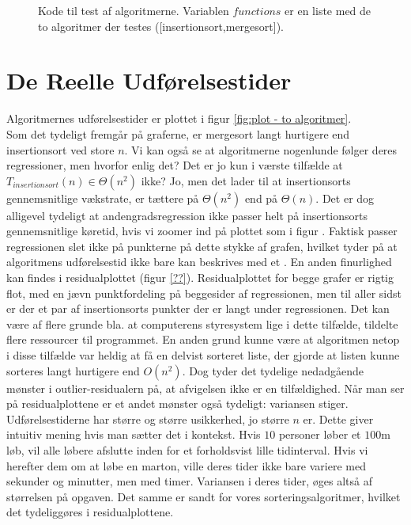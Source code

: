 \begin{figure}
	\begin{center}
		
	\end{center}
	\caption{Kode til test af algoritmerne. Variablen $functions$ er en liste med de to algoritmer der testes ([insertionsort,mergesort]).}
	\label{fig:Kode til test af algoritmerne}
\end{figure}



\section{De Reelle Udførelsestider}
\label{sec:De Reelle Køretider}

Algoritmernes udførelsestider er plottet i figur \ref{fig:plot - to algoritmer}.\\

Som det tydeligt fremgår på graferne, er mergesort langt hurtigere end insertionsort ved store $n$. Vi kan også se at algoritmerne nogenlunde følger deres regressioner, men hvorfor enlig det? Det er jo kun i værste tilfælde at $T_{insertionsort}(n) \in \Theta (n^2)$ ikke? Jo, men det lader til at insertionsorts gennemsnitlige vækstrate, er tættere på $\Theta (n^2)$ end på $\Theta (n)$. Det er dog alligevel tydeligt at andengradsregression ikke passer helt på insertionsorts gennemsnitlige køretid, hvis vi zoomer ind på plottet som i figur . Faktisk passer regressionen slet ikke på punkterne på dette stykke af grafen, hvilket tyder på at algoritmens udførelsestid ikke bare kan beskrives med et . En anden finurlighed kan findes i residualplottet (figur \ref{??}). Residualplottet for begge grafer er rigtig flot, med en jævn punktfordeling på beggesider af regressionen, men til aller sidst er der et par af insertionsorts punkter der er langt under regressionen. Det kan være af flere grunde bla. at computerens styresystem lige i dette tilfælde, tildelte flere ressourcer til programmet. En anden grund kunne være at algoritmen netop i disse tilfælde var heldig at få en delvist sorteret liste, der gjorde at listen kunne sorteres langt hurtigere end $O(n^2)$. Dog tyder det tydelige nedadgående mønster i outlier-residualern på, at afvigelsen ikke er en tilfældighed. Når man ser på residualplottene er et andet mønster også tydeligt: variansen stiger. Udførelsestiderne har større og større usikkerhed, jo større $n$ er. Dette giver intuitiv mening hvis man sætter det i kontekst. Hvis $10$ personer løber et $100$m løb, vil alle løbere afslutte inden for et forholdsvist lille tidinterval. Hvis vi herefter  dem om at løbe en marton, ville deres tider ikke bare variere med sekunder og minutter, men med timer. Variansen i deres tider, øges altså af størrelsen på opgaven. Det samme er sandt for vores sorteringsalgoritmer, hvilket det tydeliggøres i residualplottene. 


